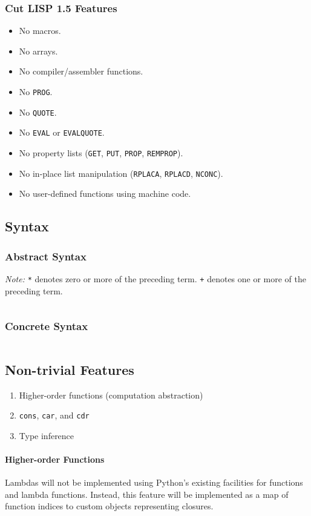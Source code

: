\documentclass[a4paper, 12pt]{article}
\begin{document}
\subsubsection{Cut LISP 1.5 Features}
\begin{itemize}
    \item No macros.
    \item No arrays.
    \item No compiler/assembler functions.
    \item No \texttt{PROG}.
    \item No \texttt{QUOTE}.
    \item No \texttt{EVAL} or \texttt{EVALQUOTE}.
    \item No property lists (\texttt{GET}, \texttt{PUT}, \texttt{PROP}, \texttt{REMPROP}).
    \item No in-place list manipulation (\texttt{RPLACA}, \texttt{RPLACD}, \texttt{NCONC}).
    \item No user-defined functions using machine code.
\end{itemize}

\newpage
\subsection{Syntax}\label{subsec:syntax}
\subsubsection{Abstract Syntax}
\textit{Note:} \texttt{*} denotes zero or more of the preceding term. \texttt{+} denotes one or more of the preceding term.
\inputminted[fontsize=\footnotesize]{bnf}{grammar_abstract.bnf}

\newpage
\subsubsection{Concrete Syntax}
\inputminted[fontsize=\footnotesize]{ebnf}{grammar.ebnf}

\newpage
\subsection{Non-trivial Features}
\begin{enumerate}
    \item Higher-order functions (computation abstraction)
    \item \texttt{cons}, \texttt{car}, and \texttt{cdr}
    \item Type inference
\end{enumerate}

\paragraph{Higher-order Functions}
Lambdas will not be implemented using Python's existing facilities for functions and lambda functions. Instead, this feature will be implemented as a map of function indices to custom objects representing closures.
\end{document}
